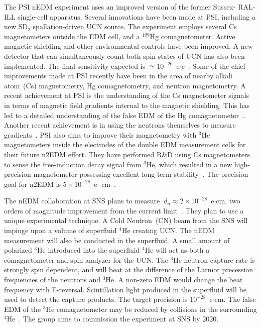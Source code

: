 The PSI nEDM experiment uses an improved version of the former Sussex-
RAL-ILL single-cell apparatus. Several innovations have been made at
PSI, including a new SD$_2$ spallation-driven UCN source. The
experiment employs several Cs magnetometers outside the EDM cell, and
a $^{199}$Hg comagnetometer. Active magnetic shielding and other
environmental controls have been improved. A new detector that can
simultaneously count both spin states of UCN has also been
implemented. The final sensitivity expected is
$\simeq 10^{-26}$~e$\cdot$c~\cite{Schmidt2016}. Some of the chief
improvements made at PSI recently have been in the area of nearby
alkali atom~(Cs) magnetometry, Hg comagnetometry, and neutron
magnetometry. A recent achievement at PSI is the understanding of the
Cs magnetometer signals in terms of magnetic field gradients internal
to the magnetic shielding. This has led to a detailed understanding of
the false EDM of the Hg comagnetometer~\cite{Afach2015_2}. Another
recent achievement is in using the neutrons themselves to measure
gradients~\cite{Afach2015_3}. PSI also aims to improve their
magnetometry with $^3$He magnetometers inside the electrodes of the
double EDM measurement cells for their future n2EDM effort. They have
performed R\&D using Cs magnetometers to sense the free-induction
decay signal from $^3$He, which resulted in a new high-precision
magnetometer possessing excellent long-term
stability~\cite{Koch2015}. The precision goal for n2EDM is
$5 \times 10^{-28}$~e$\cdot$ cm~\cite{Bernhard_talk,baker2011search}.


The nEDM collaboration at SNS plans to measure
$\ d_n\approx 2 \times 10^{-28} $~e$\cdot$cm, two orders of magnitude
improvement from the current limit~\cite{peng2008neutron}.  They plan
to use a unique experimental technique. A Cold Neutron~(CN) beam from
the SNS will impinge upon a volume of superfluid $^4$He creating
UCN. The nEDM measurement will also be conducted in the superfluid. A
small amount of polarized $^3$He introduced into the superfluid $^4$He
will act as both a comagnetometer and spin analyzer for the UCN. The
$^3$He neutron capture rate is strongly spin dependent, and will beat
at the difference of the Larmor precession frequencies of the neutrons
and $^3$He. A non-zero EDM would change the beat frequency with
E-reversal. Scintillation light produced in the superfluid will be
used to detect the capture products. The target precision is
$10^{-28}$~e$\cdot$cm. The false EDM of the $^3$He comagnetometer may
be reduced by collisions in the surrounding
$^4$He~\cite{LamGol2005}. The group aims to commission the experiment
at SNS by 2020.


